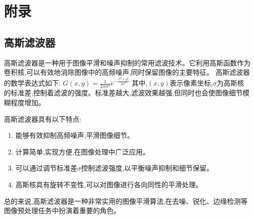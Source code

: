 \documentclass[a4paper]{article}
\theoremstyle{definition}
\theoremstyle{plain}
\theoremstyle{remark}
\begin{document}
\section*{附录}
\subsection*{高斯滤波器}
高斯滤波器是一种用于图像平滑和噪声抑制的常用滤波技术。它利用高斯函数作为卷积核,可以有效地消除图像中的高频噪声,同时保留图像的主要特征。
高斯滤波器的数学表达式如下:
$G(x,y) = \frac{1}{2\pi\sigma^2}e^{-\frac{x^2 + y^2}{2\sigma^2}}$
其中,$(x,y)$表示像素坐标,$\sigma$为高斯核的标准差,控制着滤波的强度。标准差越大,滤波效果越强,但同时也会使图像细节模糊程度增加。

高斯滤波器具有以下特点:
\begin{enumerate}
	\item 能够有效抑制高频噪声,平滑图像细节。
	\item 计算简单,实现方便,在图像处理中广泛应用。
	\item 可以通过调节标准差$\sigma$控制滤波强度,以平衡噪声抑制和细节保留。
	\item 高斯核具有旋转不变性,可以对图像进行各向同性的平滑处理。
	\end{enumerate}
\hspace{2em}总的来说,高斯滤波器是一种非常实用的图像平滑算法,在去噪、锐化、边缘检测等图像预处理任务中扮演着重要的角色。
\end{document}
